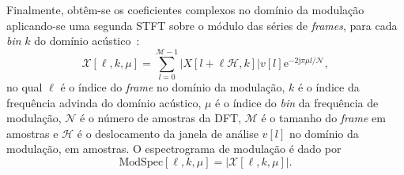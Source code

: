 Finalmente, obtêm-se os coeficientes complexos no domínio da modulação
aplicando-se uma segunda STFT sobre o módulo das séries de \textit{frames}, para
cada \textit{bin} $k$ do domínio acústico~\cite{paliwal2015}:
\begin{equation} \label{modspec_stft}
      \mathcal{X}[\ell, k, \mu] = \sum_{l = 0}^{\mathcal{M}-1}\left\lvert X[l+\ell \mathcal{H},k] \right\rvert v[l]{\mathrm{e}^{-2\mathrm{j}\pi \mu l/\mathcal{N}}},      
\end{equation}
no qual $\ell$ é o índice do \textit{frame} no domínio da modulação, $k$ é o
 índice da frequência advinda do domínio acústico, $\mu$ é o índice do
 \textit{bin} da frequência de modulação, $\mathcal{N}$ é o número de amostras
 da DFT, $\mathcal{M}$ é o tamanho do \textit{frame} em amostras e $\mathcal{H}$
 é o deslocamento da janela de análise $v[l]$ no domínio da modulação, em
 amostras. O espectrograma de modulação é dado por
\begin{equation}
\mathrm{ModSpec}[\ell, k, \mu] = \left\lvert \mathcal{X}[\ell, k, \mu]\right\rvert. 
\end{equation}


